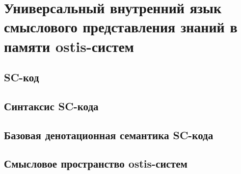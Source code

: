 \chapter{Универсальный внутренний язык смыслового представления знаний в памяти ostis-систем}
\label{chapter_sc_code}


\section{SC-код}
\section{Синтаксис SC-кода}
\section{Базовая денотационная семантика SC-кода}
\section{Смысловое пространство ostis-систем}

%